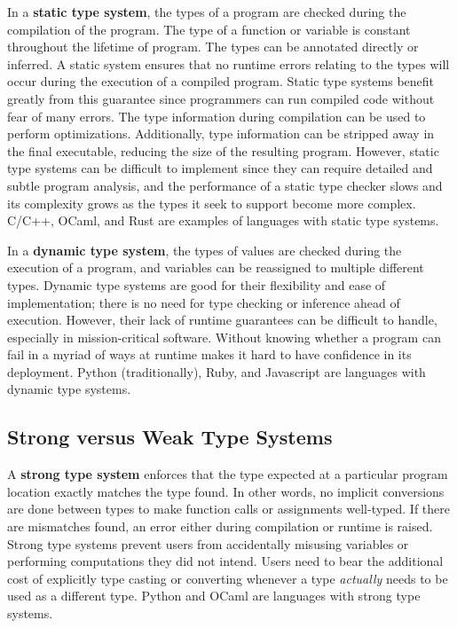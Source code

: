 \documentclass[12pt]{report}
\begin{document}
In a \textbf{static type system}, the types of a program are checked during the compilation of the program. The type of a function or variable is constant throughout the lifetime of program. The types can be annotated directly or inferred. A static system ensures that no runtime errors relating to the types will occur during the execution of a compiled program. Static type systems benefit greatly from this guarantee since programmers can run compiled code without fear of many errors. The type information during compilation can be used to perform optimizations. Additionally, type information can be stripped away in the final executable, reducing the size of the resulting program. However, static type systems can be difficult to implement since they can require detailed and subtle program analysis, and the performance of a static type checker slows and its complexity grows as the types it seek to support become more complex. C/C++, OCaml, and Rust are examples of languages with static type systems.

In a \textbf{dynamic type system}, the types of values are checked during the execution of a program, and variables can be reassigned to multiple different types. Dynamic type systems are good for their flexibility and ease of implementation; there is no need for type checking or inference ahead of execution. However, their lack of runtime guarantees can be difficult to handle, especially in mission-critical software. Without knowing whether a program can fail in a myriad of ways at runtime makes it hard to have confidence in its deployment. Python (traditionally), Ruby, and Javascript are languages with dynamic type systems.

\subsection{Strong versus Weak Type Systems}

A \textbf{strong type system} enforces that the type expected at a particular program location exactly matches the type found. In other words, no implicit conversions are done between types to make function calls or assignments well-typed. If there are mismatches found, an error either during compilation or runtime is raised. Strong type systems prevent users from accidentally misusing variables or performing computations they did not intend. Users need to bear the additional cost of explicitly type casting or converting whenever a type \textit{actually} needs to be used as a different type. Python and OCaml are languages with strong type systems.
\end{document}
